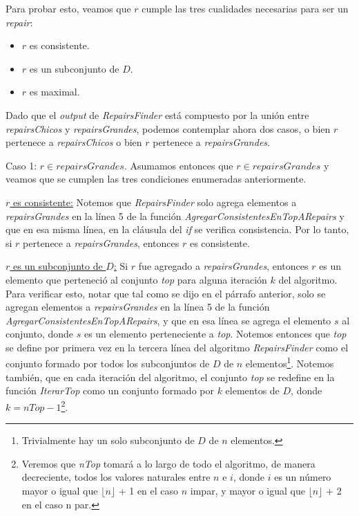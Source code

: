 \documentclass[11pt,a4paper,twoside]{tesis}
\begin{document}
Para probar esto, veamos que $r$ cumple las tres cualidades necesarias para ser un \textit{repair}:

\begin{itemize}
    \item $r$ es consistente.
    \item $r$ es un subconjunto de $D$.
    \item $r$ es maximal. 
\end{itemize}

Dado que el \textit{output} de \textit{RepairsFinder} está compuesto por la unión entre \textit{repairsChicos} y \textit{repairsGrandes}, podemos contemplar ahora dos casos, o bien $r$ pertenece a \textit{repairsChicos} o bien $r$ pertenece a \textit{repairsGrandes}.

Caso 1: $r \in repairsGrandes$. Asumamos entonces que $r \in repairsGrandes$ y veamos que se cumplen las tres condiciones enumeradas anteriormente.

\underline{$r$ es consistente:} Notemos que \textit{RepairsFinder} solo agrega elementos a \textit{repairsGrandes} en la línea 5 de la función \textit{AgregarConsistentesEnTopARepairs} y que en esa misma línea, en la cláusula del \textit{if} se verifica consistencia. Por lo tanto,  si $r$ pertenece a \textit{repairsGrandes}, entonces $r$ es consistente.

\underline{$r$ es un subconjunto de $D$:} Si $r$ fue agregado a \textit{repairsGrandes}, entonces $r$ es un elemento que perteneció al conjunto \textit{top} para alguna iteración $k$ del algoritmo. Para verificar esto, notar que tal como se dijo en el párrafo anterior, solo se agregan elementos a \textit{repairsGrandes} en la línea 5 de la función \textit{AgregarConsistentesEnTopARepairs}, y que en esa línea se agrega el elemento $s$ al conjunto, donde $s$ es un elemento perteneciente a \textit{top}. Notemos entonces que \textit{top} se define por primera vez en la tercera línea del algoritmo \textit{RepairsFinder} como el conjunto formado por todos los subconjuntos de $D$ de $n$ elementos\footnote{Trivialmente hay un solo subconjunto de $D$ de $n$ elementos.}. Notemos también, que en cada iteración del algoritmo, el conjunto \textit{top} se redefine en la función \textit{IterarTop} como un conjunto formado por $k$ elementos de $D$, donde $k = nTop - 1$\footnote{Veremos que \textit{nTop} tomará a lo largo de todo el algoritmo, de manera decreciente, todos los valores naturales entre $n$ e $i$, donde $i$ es un número mayor o igual que $\lfloor n \rfloor$ + 1 en el caso $n$ impar, y mayor o igual que  $\lfloor n \rfloor$ + 2 en el caso n par.}.
\end{document}
